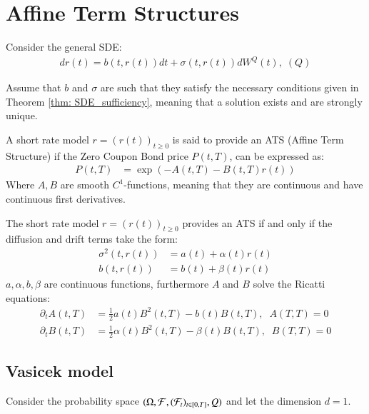 \newpage 

\section{Affine Term Structures}

Consider the general SDE:
\begin{align}
\label{eq: general_interest_rate_SDE}
dr(t) = b(t,r(t))dt + \sigma(t,r(t))dW^{Q}(t), \; (Q)    
\end{align}

Assume that $b$ and $\sigma$ are such that they satisfy the
necessary conditions given in Theorem \ref{thm: SDE_sufficiency}, meaning that a solution exists and are strongly unique. 

\begin{definition}
A short rate model $r = (r(t))_{t\geq 0}$ is said to provide an ATS (Affine Term Structure) 
if the Zero Coupon Bond price $P(t,T)$, can be expressed as:
\begin{align*}
P(t,T) &= \exp\left(
-A(t,T)-B(t,T)r(t)
\right)    
\end{align*}
Where $A, B$ are smooth $C^{1}$-functions, meaning that they are continuous and have continuous first derivatives.
\end{definition}

\begin{proposition}
\label{prop: condition_on_r_ATS}
The short rate model $r = (r(t))_{t\geq 0}$ provides an ATS if and only if the diffusion and drift terms take the form: 
\begin{align*}
\sigma^{2}(t,r(t)) &= a(t) + \alpha(t)r(t) \\ 
b(t,r(t)) &= b(t) + \beta(t)r(t)
\end{align*}
$a, \alpha, b, \beta$ are continuous functions, furthermore $A$ and $B$ solve the Ricatti equations: 
\begin{align*}
\partial_{t}A(t,T) &= \frac{1}{2}a(t)B^{2}(t,T) - b(t)B(t,T), \;\; A(T,T) = 0 \\ 
\partial_{t}B(t,T) &= \frac{1}{2}\alpha(t)B^{2}(t,T) - \beta(t)B(t,T), \;\; B(T,T) = 0
\end{align*}
\end{proposition}

\subsection{Vasicek model}
Consider the probability space $(\Omega, \mathcal{F}, (\mathcal{F}_{t})_{t \in[0,T]}, Q)$ and let the dimension $d = 1$.

